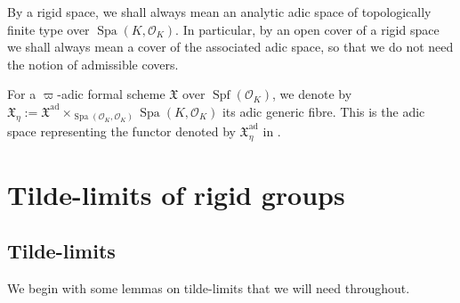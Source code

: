 \documentclass[10pt,oneside]{amsart}
\theoremstyle{definition}
\begin{document}
	By a rigid space, we shall always mean an analytic adic space of topologically finite type over $\operatorname{Spa}(K,\mathcal O_K)$. 
	In particular, by an open cover of a rigid space we shall always mean a cover of the associated adic space, so that we do not need the notion of admissible covers.
	
	For a $\varpi$-adic formal scheme $\mathfrak X$ over $\operatorname{Spf}(\mathcal O_K)$, we denote by $\mathfrak X_\eta:=\mathfrak X^{\mathrm{ad}}\times_{\operatorname{Spa}(\mathcal O_K,\mathcal O_K)}\operatorname{Spa}(K,\mathcal O_K)$ its adic generic fibre. This is the adic space representing the functor  denoted by  $\mathfrak X^{\mathrm{ad}}_{\eta}$ in \cite[\S 2.2]{SW}.


	
	\section{Tilde-limits of rigid groups} \label{section:tilde_limit}
  
	

		\subsection{Tilde-limits} 
	We begin with some lemmas on tilde-limits that we will need throughout.
		
\end{document}
